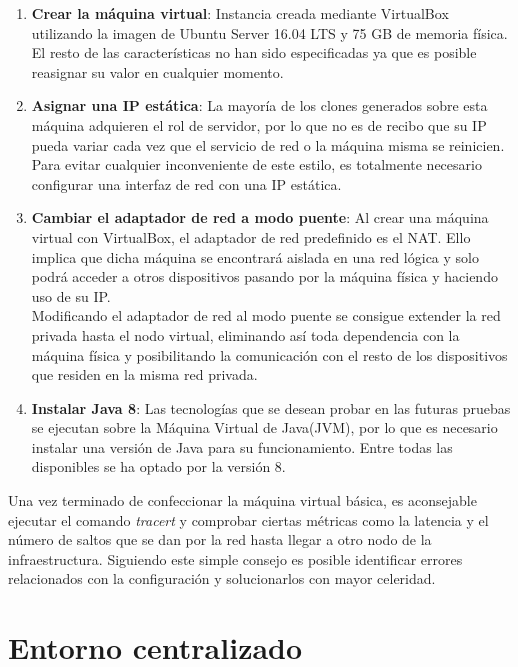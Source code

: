 \begin{enumerate}
	
	\item \textbf{Crear la máquina virtual}: Instancia creada mediante VirtualBox utilizando la imagen de Ubuntu Server 16.04 LTS y 75 GB de memoria física. El resto de las características no han sido especificadas ya que es posible reasignar su valor en cualquier momento.
	
	\item \textbf{Asignar una IP estática}: La mayoría de los clones generados sobre esta máquina adquieren el rol de servidor, por lo que no es de recibo que su IP pueda variar cada vez que el servicio de red o la máquina misma se reinicien. Para evitar cualquier inconveniente de este estilo, es totalmente necesario configurar una interfaz de red con una IP estática.
	
	\item \textbf{Cambiar el adaptador de red a modo puente}: Al crear una máquina virtual con VirtualBox, el adaptador de red predefinido es el NAT. Ello implica que dicha máquina se encontrará aislada en una red lógica y solo podrá acceder a otros dispositivos pasando por la máquina física y haciendo uso de su IP.\\
	
	Modificando el adaptador de red al modo puente se consigue extender la red privada hasta el nodo virtual, eliminando así toda dependencia con la máquina física y posibilitando la comunicación con el resto de los dispositivos que residen en la misma red privada.
	
	\item \textbf{Instalar Java 8}: Las tecnologías que se desean probar en las futuras pruebas se ejecutan sobre la Máquina Virtual de Java(JVM), por lo que es necesario instalar una versión de Java para su funcionamiento. Entre todas las disponibles se ha optado por la versión 8.
	
\end{enumerate}

Una vez terminado de confeccionar la máquina virtual básica, es aconsejable ejecutar el comando \textit{tracert} y comprobar ciertas métricas como la latencia y el número de saltos que se dan por la red hasta llegar a otro nodo de la infraestructura. Siguiendo este simple consejo es posible identificar errores relacionados con la configuración y solucionarlos con mayor celeridad.

\clearpage

\section{Entorno centralizado}

